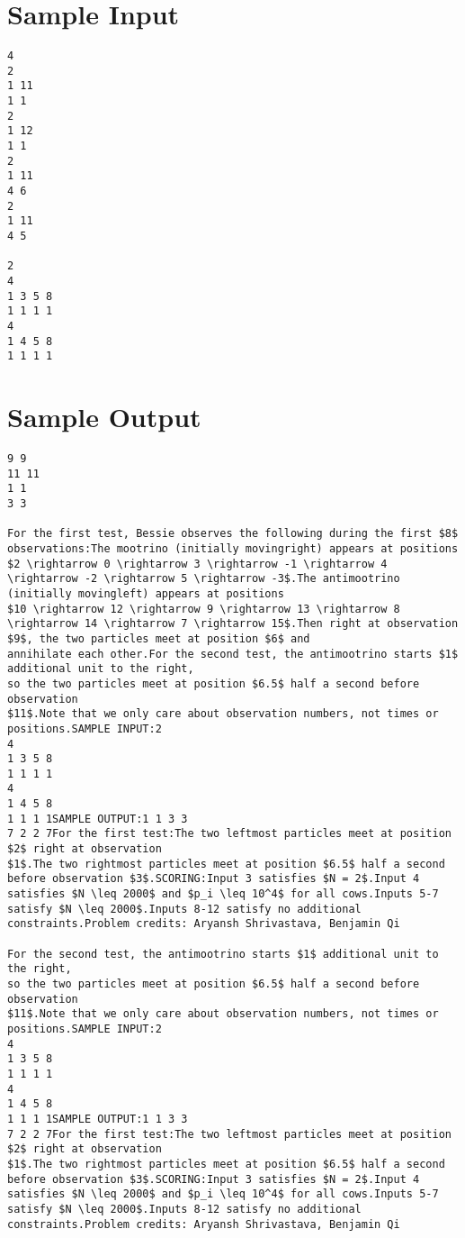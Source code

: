 \documentclass[12pt]{article}
\begin{document}
\section*{Sample Input}
\begin{verbatim}
4
2
1 11
1 1
2
1 12
1 1
2
1 11
4 6
2
1 11
4 5

2
4
1 3 5 8
1 1 1 1
4
1 4 5 8
1 1 1 1
\end{verbatim}

\section*{Sample Output}
\begin{verbatim}
9 9
11 11
1 1
3 3

For the first test, Bessie observes the following during the first $8$
observations:The mootrino (initially movingright) appears at positions
$2 \rightarrow 0 \rightarrow 3 \rightarrow -1 \rightarrow 4 \rightarrow -2 \rightarrow 5 \rightarrow -3$.The antimootrino (initially movingleft) appears at positions
$10 \rightarrow 12 \rightarrow 9 \rightarrow 13 \rightarrow 8 \rightarrow 14 \rightarrow 7 \rightarrow 15$.Then right at observation $9$, the two particles meet at position $6$ and
annihilate each other.For the second test, the antimootrino starts $1$ additional unit to the right,
so the two particles meet at position $6.5$ half a second before observation
$11$.Note that we only care about observation numbers, not times or positions.SAMPLE INPUT:2
4
1 3 5 8
1 1 1 1
4
1 4 5 8
1 1 1 1SAMPLE OUTPUT:1 1 3 3
7 2 2 7For the first test:The two leftmost particles meet at position $2$ right at observation
$1$.The two rightmost particles meet at position $6.5$ half a second
before observation $3$.SCORING:Input 3 satisfies $N = 2$.Input 4 satisfies $N \leq 2000$ and $p_i \leq 10^4$ for all cows.Inputs 5-7 satisfy $N \leq 2000$.Inputs 8-12 satisfy no additional constraints.Problem credits: Aryansh Shrivastava, Benjamin Qi

For the second test, the antimootrino starts $1$ additional unit to the right,
so the two particles meet at position $6.5$ half a second before observation
$11$.Note that we only care about observation numbers, not times or positions.SAMPLE INPUT:2
4
1 3 5 8
1 1 1 1
4
1 4 5 8
1 1 1 1SAMPLE OUTPUT:1 1 3 3
7 2 2 7For the first test:The two leftmost particles meet at position $2$ right at observation
$1$.The two rightmost particles meet at position $6.5$ half a second
before observation $3$.SCORING:Input 3 satisfies $N = 2$.Input 4 satisfies $N \leq 2000$ and $p_i \leq 10^4$ for all cows.Inputs 5-7 satisfy $N \leq 2000$.Inputs 8-12 satisfy no additional constraints.Problem credits: Aryansh Shrivastava, Benjamin Qi


\end{verbatim}
\end{document}
